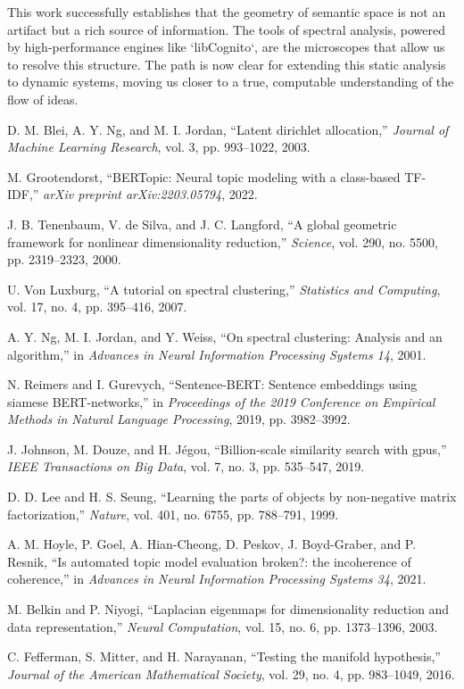 \documentclass[conference]{IEEEtran}
\begin{document}
This work successfully establishes that the geometry of semantic space is not an artifact but a rich source of information. The tools of spectral analysis, powered by high-performance engines like `libCognito`, are the microscopes that allow us to resolve this structure. The path is now clear for extending this static analysis to dynamic systems, moving us closer to a true, computable understanding of the flow of ideas.

\balance

\begin{thebibliography}{9}

D. M. Blei, A. Y. Ng, and M. I. Jordan, ``Latent dirichlet allocation,'' \emph{Journal of Machine Learning Research}, vol. 3, pp. 993--1022, 2003.

M. Grootendorst, ``BERTopic: Neural topic modeling with a class-based TF-IDF,'' \emph{arXiv preprint arXiv:2203.05794}, 2022.

J. B. Tenenbaum, V. de Silva, and J. C. Langford, ``A global geometric framework for nonlinear dimensionality reduction,'' \emph{Science}, vol. 290, no. 5500, pp. 2319--2323, 2000.

U. Von Luxburg, ``A tutorial on spectral clustering,'' \emph{Statistics and Computing}, vol. 17, no. 4, pp. 395--416, 2007.

A. Y. Ng, M. I. Jordan, and Y. Weiss, ``On spectral clustering: Analysis and an algorithm,'' in \emph{Advances in Neural Information Processing Systems 14}, 2001.

N. Reimers and I. Gurevych, ``Sentence-BERT: Sentence embeddings using siamese BERT-networks,'' in \emph{Proceedings of the 2019 Conference on Empirical Methods in Natural Language Processing}, 2019, pp. 3982--3992.

J. Johnson, M. Douze, and H. Jégou, ``Billion-scale similarity search with gpus,'' \emph{IEEE Transactions on Big Data}, vol. 7, no. 3, pp. 535--547, 2019.

D. D. Lee and H. S. Seung, ``Learning the parts of objects by non-negative matrix factorization,'' \emph{Nature}, vol. 401, no. 6755, pp. 788--791, 1999.

A. M. Hoyle, P. Goel, A. Hian-Cheong, D. Peskov, J. Boyd-Graber, and P. Resnik, ``Is automated topic model evaluation broken?: the incoherence of coherence,'' in \emph{Advances in Neural Information Processing Systems 34}, 2021.

M. Belkin and P. Niyogi, ``Laplacian eigenmaps for dimensionality reduction and data representation,'' \emph{Neural Computation}, vol. 15, no. 6, pp. 1373--1396, 2003.

C. Fefferman, S. Mitter, and H. Narayanan, ``Testing the manifold hypothesis,'' \emph{Journal of the American Mathematical Society}, vol. 29, no. 4, pp. 983--1049, 2016.

\end{thebibliography}
\end{document}
